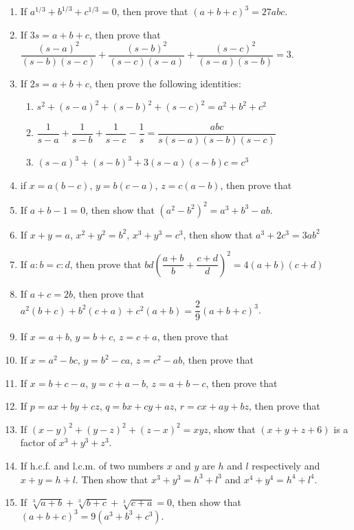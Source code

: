 \begin{enumerate}
\begin{enumerate}[label=(\alph*)]
			\end{enumerate}
			\item If $a^{1/3}+b^{1/3}+c^{1/3}=0$, then prove that $(a+b+c)^3=27abc$.
			\item If $3s=a+b+c$, then prove that $\dfrac{(s-a)^2}{(s-b)(s-c)}+\dfrac{(s-b)^2}{(s-c)(s-a)}+\dfrac{(s-c)^2}{(s-a)(s-b)}=3$.
			
			
			\item If $2s=a+b+c$, then prove the following identities:
			\begin{enumerate}[label=(\alph*)]
				\item $s^2+(s-a)^2+(s-b)^2+(s-c)^2=a^2+b^2+c^2$
				\item $\dfrac{1}{s-a}+\dfrac{1}{s-b}+\dfrac{1}{s-c}-\dfrac{1}{s}=\dfrac{abc}{s(s-a)(s-b)(s-c)}$
				\item $(s-a)^3+(s-b)^3+3(s-a)(s-b)c=c^3$
			\end{enumerate}
			
			\item if $x=a(b-c)$, $y=b(c-a)$, $z=c(a-b)$, then prove that 
			
			\item If $a+b-1=0$, then show that $(a^2-b^2)^2=a^3+b^3-ab$.

			\item If $x+y=a$, $x^2+y^2=b^2$, $x^3+y^3=c^3$, then show that $a^3+2c^3=3ab^2$
			\item If $a\mathbin{:}b = c\mathbin{:}d$, then prove that $bd\left( \dfrac{a+b}{b}+\dfrac{c+d}{d}\right)^2=4(a+b)(c+d)$
			\item If $a+c=2b$, then prove that $a^2(b+c)+b^2(c+a)+c^2(a+b)=\dfrac{2}{9}(a+b+c)^3$.
			\item If $x=a+b$, $y=b+c$, $z=c+a$, then prove that 
			\item If $x=a^2-bc$, $y=b^2-ca$, $z=c^2-ab$, then prove that 
			\item If $x=b+c-a$, $y=c+a-b$, $z=a+b-c$, then prove that 
			\item If $p=ax+by+cz$, $q=bx+cy+az$, $r=cx+ay+bz$, then prove that 
			\item If $(x-y)^2+(y-z)^2+(z-x)^2=xyz$, show that $(x+y+z+6)$ is a factor of $x^3+y^3+z^3$.
			\item If h.c.f. and l.c.m. of two numbers $x$ and $y$ are $h$ and $l$ respectively and $x+y=h+l$. Then show that $x^3+y^3=h^3+l^3$ and $x^4+y^4=h^4+l^4$.
			\item If $\sqrt[3]{a+b}+\sqrt[3]{b+c}+\sqrt[3]{c+a}=0$, then show that $(a+b+c)^3=9(a^3+b^3+c^3)$.




\end{enumerate}
